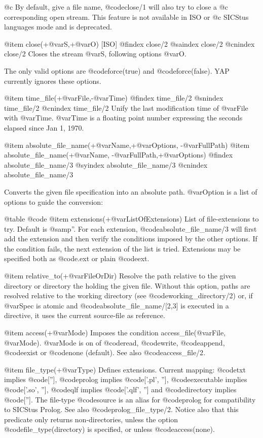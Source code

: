 {{{{{@c By default, give a file name, @code{close/1} will also try to close a
@c corresponding open stream. This feature is not available in ISO or
@c SICStus languages mode and is deprecated.

@item close(+@var{S},+@var{O}) [ISO]
@findex close/2
@saindex close/2
@cnindex close/2
Closes the stream @var{S}, following options @var{O}. 

The only valid options are @code{force(true)} and @code{force(false)}.
YAP currently ignores these options.

@item time_file(+@var{File},-@var{Time})
@findex time_file/2
@snindex time_file/2
@cnindex time_file/2
Unify the last modification time of @var{File} with
@var{Time}. @var{Time} is a floating point number expressing the seconds
elapsed since Jan 1, 1970.

@item absolute_file_name(+@var{Name},+@var{Options}, -@var{FullPath})
@item absolute_file_name(+@var{Name}, -@var{FullPath},+@var{Options})
@findex absolute_file_name/3
@syindex absolute_file_name/3
@cnindex absolute_file_name/3

Converts the given file specification into an absolute path.
@var{Option} is a list of options to guide the conversion:

@table @code
    @item extensions(+@var{ListOfExtensions})
List of file-extensions to try.  Default is @samp{''}.  For each
extension, @code{absolute_file_name/3} will first add the extension and then
verify the conditions imposed by the other options.  If the condition
fails, the next extension of the list is tried.  Extensions may be
specified both as @code{.ext} or plain @code{ext}.

    @item relative_to(+@var{FileOrDir})
Resolve the path relative to the given directory or directory the
holding the given file.  Without this option, paths are resolved
relative to the working directory (see @code{working_directory/2}) or,
if @var{Spec} is atomic and @code{absolute_file_name/[2,3]} is executed
in a directive, it uses the current source-file as reference.

    @item access(+@var{Mode})
Imposes the condition access_file(@var{File}, @var{Mode}).  @var{Mode}
is on of @code{read}, @code{write}, @code{append}, @code{exist} or
@code{none} (default). 
See also @code{access_file/2}.

    @item file_type(+@var{Type})
Defines extensions. Current mapping: @code{txt} implies @code{['']},
@code{prolog} implies @code{['.pl', '']}, @code{executable} implies
@code{['.so', '']}, @code{qlf} implies @code{['.qlf', '']} and
@code{directory} implies @code{['']}.  The file-type @code{source}
is an alias for @code{prolog} for compatibility to SICStus Prolog.
See also @code{prolog_file_type/2}. Notice also that this predicate only
returns non-directories, unless the option @code{file_type(directory)} is
specified, or unless @code{access(none)}.

}}}}}
